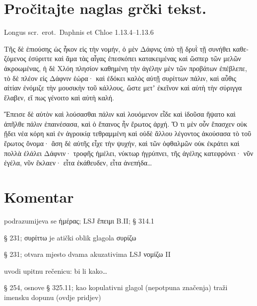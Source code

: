 \section*{Pročitajte naglas grčki tekst.}

Longus scr.~erot.\ Daphnis et Chloe 1.13.4–1.13.6


\medskip


{\large

\begin{greek}

\noindent Τῆς δὲ ἐπιούσης ὡς ἧκον εἰς τὴν νομήν, ὁ μὲν Δάφνις ὑπὸ τῇ δρυῒ τῇ συνήθει καθεζόμενος ἐσύριττε καὶ ἅμα τὰς αἶγας ἐπεσκόπει κατακειμένας καὶ ὥσπερ τῶν μελῶν ἀκροωμένας, ἡ δὲ Χλόη πλησίον καθημένη τὴν ἀγέλην μὲν τῶν προβάτων ἐπέβλεπε, τὸ δὲ πλέον εἰς Δάφνιν ἑώρα· καὶ ἐδόκει καλὸς αὐτῇ συρίττων πάλιν, καὶ αὖθις αἰτίαν ἐνόμιζε τὴν μουσικὴν τοῦ κάλλους, ὥστε μετʼ ἐκεῖνον καὶ αὐτὴ τὴν σύριγγα ἔλαβεν, εἴ πως γένοιτο καὶ αὐτὴ καλή.

Ἔπεισε δὲ αὐτὸν καὶ λούσασθαι πάλιν καὶ λουόμενον εἶδε καὶ ἰδοῦσα ἥψατο καὶ ἀπῆλθε πάλιν ἐπαινέσασα, καὶ ὁ ἔπαινος ἦν ἔρωτος ἀρχή. Ὅ τι μὲν οὖν ἔπασχεν οὐκ ᾔδει νέα κόρη καὶ ἐν ἀγροικίᾳ τεθραμμένη καὶ οὐδὲ ἄλλου λέγοντος ἀκούσασα τὸ τοῦ ἔρωτος ὄνομα· ἄση δὲ αὐτῆς εἶχε τὴν ψυχήν, καὶ τῶν ὀφθαλμῶν οὐκ ἐκράτει καὶ πολλὰ ἐλάλει Δάφνιν· τροφῆς ἠμέλει, νύκτωρ ἠγρύπνει, τῆς ἀγέλης κατεφρόνει· νῦν ἐγέλα, νῦν ἔκλαεν· εἶτα ἐκάθευδεν, εἶτα ἀνεπήδα\dots

\end{greek}

}


\section*{Komentar}

\begin{description}[noitemsep]
\item[ἐπιούσης] podrazumijeva se ἡμέρας; LSJ ἔπειμι B.II; § 314.1
\item[ἐσύριττε] § 231; συρίττω je atički oblik glagola συρίζω
\item[ἐνόμιζε] § 231; otvara mjesto dvama akuzativima LSJ νομίζω II
\item[εἴ πως] uvodi upitnu rečenicu: bi li kako\dots
\item[γένοιτο] § 254, osnove § 325.11; kao kopulativni glagol (nepotpuna značenja) traži imensku dopunu (ovdje pridjev)

\end{description}


